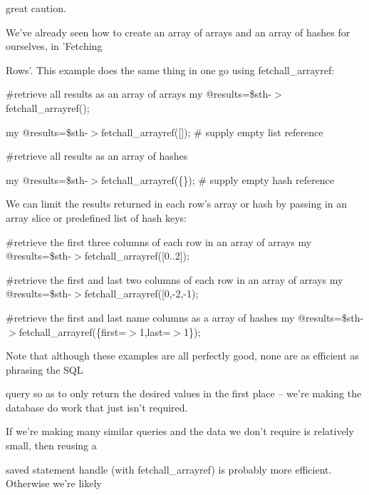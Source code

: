 \documentclass[a4paper,11pt]{book}
\begin{document}
\noindent great caution.

\noindent 

\noindent We've already seen how to create an array of arrays and an array of hashes for ourselves, in 'Fetching

\noindent Rows'. This example does the same thing in one go using fetchall\_arrayref:

\noindent 

\noindent \#retrieve all results as an array of arrays my @results=\$sth-$>$fetchall\_arrayref();

\noindent my @results=\$sth-$>$fetchall\_arrayref([]); \# supply empty list reference

\noindent 

\noindent \#retrieve all results as an array of hashes

\noindent my @results=\$sth-$>$fetchall\_arrayref(\{\}); \# supply empty hash reference

\noindent 

\noindent We can limit the results returned in each row's array or hash by passing in an array slice or predefined list of hash keys:

\noindent 

\noindent \#retrieve the first three columns of each row in an array of arrays my @results=\$sth-$>$fetchall\_arrayref([0..2]);

\noindent 

\noindent \#retrieve the first and last two columns of each row in an array of arrays my @results=\$sth-$>$fetchall\_arrayref([0,-2,-1);

\noindent 

\noindent \#retrieve the first and last name columns as a array of hashes my @results=\$sth-$>$fetchall\_arrayref(\{first=$>$1,last=$>$1\});

\noindent 

\noindent Note that although these examples are all perfectly good, none are as efficient as phrasing the SQL

\noindent query so as to only return the desired values in the first place -- we're making the database do work that just isn't required.

\noindent 

\noindent If we're making many similar queries and the data we don't require is relatively small, then reusing a

\noindent saved statement handle (with fetchall\_arrayref) is probably more efficient. Otherwise we're likely
\end{document}
